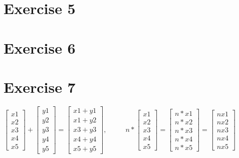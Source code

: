 \documentclass[a4paper]{article}
\begin{document}
\section*{Exercise 5}

\section*{Exercise 6}

\section*{Exercise 7}

$
\begin{bmatrix} 
x1\\x2\\x3\\x4\\x5
\end{bmatrix}
+
\begin{bmatrix} 
y1\\y2\\y3\\y4\\y5
\end{bmatrix}
=
\begin{bmatrix} 
x1+y1\\x1+y2\\x3+y3\\x4+y4\\x5+y5
\end{bmatrix}
,
\ \ \ \ \ \ \ \ \ \ \ \ 
n *
\begin{bmatrix} 
x1\\x2\\x3\\x4\\x5
\end{bmatrix}
=
\begin{bmatrix} 
n *x1\\n* x2\\n*x3\\n*x4\\n*x5
\end{bmatrix}
=
\begin{bmatrix} 
nx1\\nx2\\nx3\\nx4\\nx5
\end{bmatrix}
$
\end{document}
